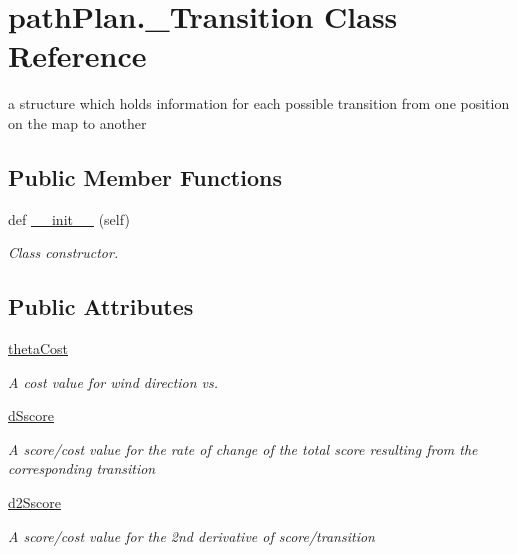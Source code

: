 \hypertarget{classpath_plan_1_1___transition}{}\section{path\+Plan.\+\_\+\+Transition Class Reference}
\label{classpath_plan_1_1___transition}


a structure which holds information for each possible transition from one position on the map to another  


\subsection*{Public Member Functions}
\begin{DoxyCompactItemize}
\item 
def \mbox{\hyperlink{classpath_plan_1_1___transition_ae6a85dd74adbd4cda96fded2ba5d398e}{\+\_\+\+\_\+init\+\_\+\+\_\+}} (self)
\begin{DoxyCompactList}\small\item\em Class constructor. \end{DoxyCompactList}\end{DoxyCompactItemize}
\subsection*{Public Attributes}
\begin{DoxyCompactItemize}
\item 
\mbox{\hyperlink{classpath_plan_1_1___transition_a405e375ebe2b2a5d66b50721c338c6e8}{theta\+Cost}}
\begin{DoxyCompactList}\small\item\em A cost value for wind direction vs. \end{DoxyCompactList}\item 
\mbox{\hyperlink{classpath_plan_1_1___transition_afa609d3874eb34ae2aa3efa67d762896}{d\+Sscore}}
\begin{DoxyCompactList}\small\item\em A score/cost value for the rate of change of the total score resulting from the corresponding transition \end{DoxyCompactList}\item 
\mbox{\hyperlink{classpath_plan_1_1___transition_a03af53bb2bb866253742341b1c7b33fd}{d2\+Sscore}}
\begin{DoxyCompactList}\small\item\em A score/cost value for the 2nd derivative of score/transition \end{DoxyCompactList}\end{DoxyCompactItemize}


